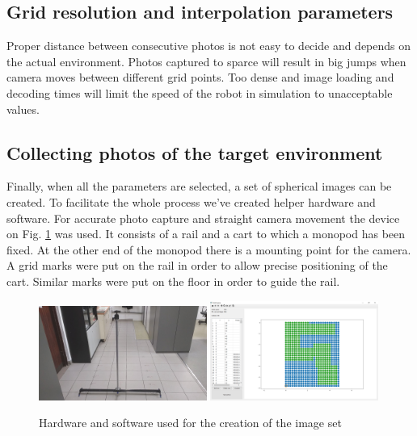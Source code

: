 \documentclass{svproc}
\begin{document}
\subsection{Grid resolution and interpolation parameters}

Proper distance between consecutive photos is not easy to decide and depends on the
actual environment. Photos captured to sparce will result in big jumps when camera
moves between different grid points. Too dense and image loading and decoding
times will limit the speed of the robot in simulation to unacceptable values.

\subsection{Collecting photos of the target environment}

Finally, when all the parameters are selected, a set of spherical images can be created.
To facilitate the whole process we've created helper hardware and software.
For accurate photo capture and straight camera movement the device on Fig. \ref{fig:rig} was used.
It consists of a rail and a cart to which a monopod has been fixed.
At the other end of the monopod there is a mounting point for the camera.
A grid marks were put on the rail in order to allow precise positioning of the cart.
Similar marks were put on the floor in order to guide the rail.

\begin{figure}[!ht]
    \centering
    \includegraphics[width=0.49\textwidth]{img/rig/calosc.jpg}\hfill%
    \includegraphics[width=0.49\textwidth]{img/creator.png}\\
    \caption{Hardware and software used for the creation of the image set}
    \label{fig:rig}
\end{figure}
\end{document}

